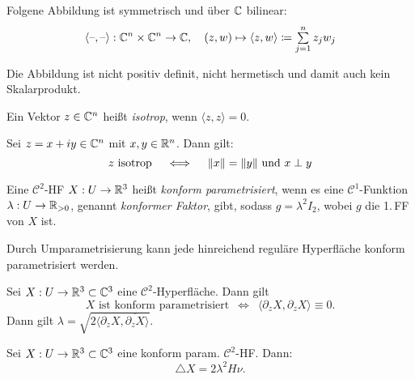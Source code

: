 \documentclass{cheat-sheet}
\begin{document}
\begin{defn}
  Folgene Abbildung ist symmetrisch und über $\mathbb{C}$ bilinear:
  \[
    \langle \blank , \blank \rangle : \C^n \times \C^n \to \C, \quad
    (z, w) \mapsto \langle z, w \rangle \coloneqq \sum_{j=1}^n z_j w_j
  \]
\end{defn}

\begin{bem}
  Die Abbildung ist nicht positiv definit, nicht hermetisch und damit auch kein Skalarprodukt.
\end{bem}

\begin{defn}
  Ein Vektor $z \in \mathbb{C}^n$ heißt \emph{isotrop}, wenn $\langle z, z \rangle = 0$.
\end{defn}


\begin{lem}
  Sei $z = x + iy \in \mathbb{C}^n$ mit $x, y \in \mathbb{R}^n$. Dann gilt:
  \[ z \text{ isotrop} \quad \iff \quad \lVert x\rVert = \lVert y\rVert \text{ und } x \perp y \]
\end{lem}


\begin{defn}
  Eine $\mathcal{C}^2$-HF $X : U \to \mathbb{R}^3$ heißt \emph{konform parametrisiert}, wenn es eine $\mathcal{C}^1$-Funktion $\lambda : U \to \mathbb{R}_{>0}$, genannt \emph{konformer Faktor}, gibt, sodass $g = \lambda^2 I_2$, wobei $g$ die 1.\,FF von $X$ ist.
\end{defn}

\begin{bem}
  Durch Umparametrisierung kann jede hinreichend reguläre Hyperfläche konform parametrisiert werden.
\end{bem}

\begin{lem}
  Sei $X : U \to \mathbb{R}^3 \subset \mathbb{C}^3$ eine $\mathcal{C}^2$-Hyperfläche. Dann gilt
  \[
    \text{$X$ ist konform parametrisiert}
    \enspace \iff \enspace
    \langle \partial_z X, \partial_z X \rangle \equiv 0.
  \]
  Dann gilt $\lambda = \sqrt{2 \langle \partial_z X , \overline{\partial_z X} \rangle}$.
\end{lem}

\begin{lem}
  Sei $X : U \to \mathbb{R}^3 \subset \mathbb{C}^3$ eine konform param. $\mathcal{C}^2$-HF. Dann:
  \[ \triangle X = 2 \lambda^2 H \nu. \]
\end{lem}
\end{document}
